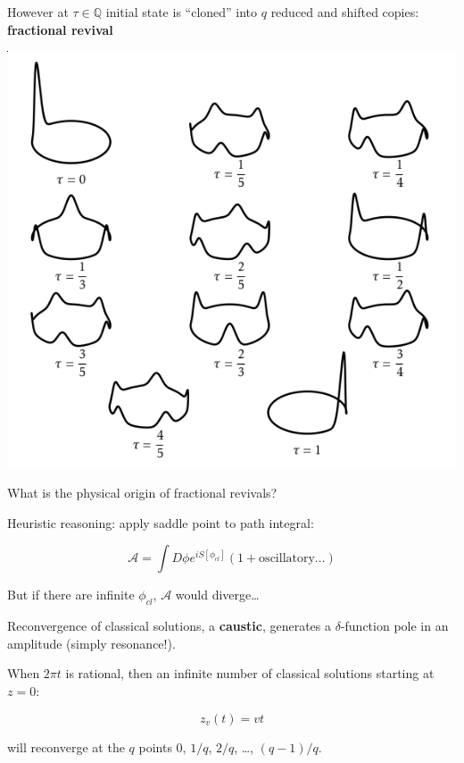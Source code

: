 \documentclass{beamer}
\newcommand\inputpgf[2]{{
\let\pgfimageWithoutPath\pgfimage
\renewcommand{\pgfimage}[2][]{\pgfimageWithoutPath[##1]{#1/##2}}

}}
\begin{document}
\begin{frame}
    However at $\tau \in \mathbb{Q}$ initial state is ``cloned'' into $q$ reduced and shifted copies: \textbf{fractional revival}

    \begin{center} 
        \includegraphics[scale=0.4]{images/mergiata2}
    \end{center}
\end{frame}

\begin{frame}
    What is the physical origin of fractional revivals?

    \vfill

    Heuristic reasoning: apply saddle point to path integral:

    \begin{equation}
        \mathcal{A} = \int D\phi e^{iS[\phi_{cl}]} (1 + \text{oscillatory}\ldots)
        \label{}
    \end{equation}

    \vfill

    But if there are infinite $\phi_{cl}$, $\mathcal{A}$ would diverge\ldots

    \vfill
\end{frame}

\begin{frame}
    Reconvergence of classical solutions, a \textbf{caustic}, generates a $\delta$-function pole in an amplitude (simply resonance!). 
    
    \vfill

    When $2\pi t$ is rational, then an infinite number of classical solutions starting at $z=0$:

    \begin{equation}
        z_v(t) = vt
        \label{}
    \end{equation}


    will reconverge at the $q$ points $0$, $1/q$, $2/q$, \ldots, $(q-1)/q$.
\end{frame}

\begin{frame}
\makebox[\textwidth][c]{
    \scalebox{0.8}{\inputpgf{images/}{butterfly.pgf}} }
\end{frame}
\end{document}
